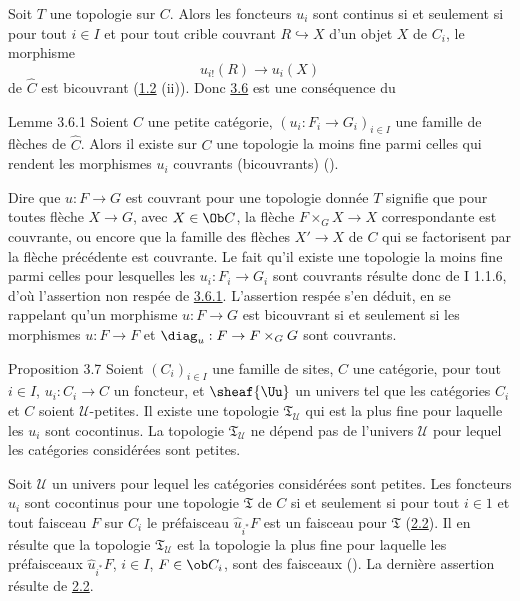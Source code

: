 \documentclass[10pt]{../fichiers-configuration-latex/smfart}
\begin{document}
Soit $T$ une topologie sur $C$. Alors les foncteurs $u_i$ sont
continus si et seulement si pour tout $i\in I$ et pour tout crible
couvrant $R\hookrightarrow X$ d'un objet $X$ de $C_i$,\pageoriginale
le morphisme
$$
u_{i!}(R)\longrightarrow u_i(X)
$$
de $\widehat{C}$ est bicouvrant (\hyperref[III.prop1.2]{1.2} (ii)). Donc
\hyperref[III.prop3.6]{3.6} est une conséquence du

\begin{enonce*}{Lemme 3.6.1}
Soient $C$ une petite catégorie, $(u_i:F_i\rightarrow G_i)_{i\in
I}$ une famille de flèches de $\widehat{C}$. Alors il existe sur
$C$ une topologie la moins fine parmi celles qui rendent les
morphismes $u_i$ couvrants (\resp bicouvrants)
{\rm()}.
\end{enonce*}

Dire que $u:F\rightarrow G$ est couvrant pour une topologie
donnée $T$ signifie que pour toutes flèche $X\rightarrow G$,
avec $X\in \Ob C$, la flèche $F\times_G X\rightarrow X$
correspondante est couvrante, ou encore que la famille des flèches
$X'\rightarrow X$ de $C$ qui se factorisent par la flèche
précédente est couvrante. Le fait qu'il existe une topologie
la moins fine parmi celles pour lesquelles les $u_i:F_i\rightarrow
G_i$ sont couvrants résulte donc de I 1.1.6, d'où l'assertion
non respée de \hyperref[III.lem3.6.1]{3.6.1}. L'assertion respée s'en
déduit, en se rappelant qu'un morphisme $u:F\rightarrow G$ est
bicouvrant si et seulement si les morphismes $u:F\rightarrow F$ et
$\diag_u:F\rightarrow F\times_G G$ sont couvrants.

\begin{enonce*}{Proposition 3.7}
Soient $(C_i)_{i\in I}$ une famille de sites, $C$ une catégorie,
pour tout $i\in I$, $u_i:C_i\rightarrow C$ un foncteur, et
$\sheaf{\Uu}$ un univers tel que les catégories $C_i$ et $C$
soient $𝒰$-petites. Il existe une topologie
$\mathfrak{T}_{𝒰}$ qui est la plus fine pour laquelle les
$u_i$ sont cocontinus. La topologie $\mathfrak{T}_{𝒰}$ ne
dépend pas de l'univers $𝒰$ pour lequel les
catégories considérées sont petites.
\end{enonce*}

Soit $𝒰$ un univers pour lequel les catégories
considérées sont petites. Les foncteurs $u_i$ sont
cocontinus pour une topologie $\mathfrak{T}$ de $C$ si et seulement
si pour tout $i\in 1$ et tout faisceau $F$ sur $C_i$ le
préfaisceau $\widehat{u}_{i^{\ast}}F$ est un faisceau pour
$\mathfrak{T}$ (\hyperref[III.prop2.2]{2.2}). Il en résulte que la
topologie $\mathfrak{T}_{𝒰}$ est la topologie la plus fine
pour laquelle les préfaisceaux $\widehat{u}_{i^\ast}F$, $i\in
I$, $F\in \ob C_i$, sont des faisceaux (). La
dernière assertion résulte de \hyperref[III.prop2.2]{2.2}.
\end{document}

